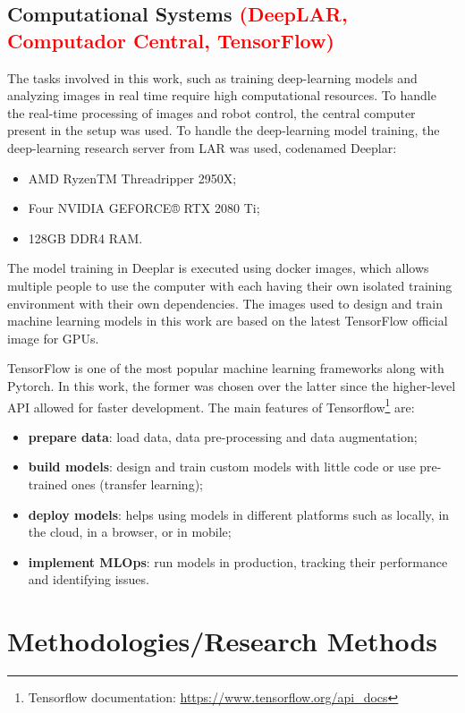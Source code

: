 \subsection{Computational Systems \textcolor{red}{(DeepLAR, Computador Central, TensorFlow)}}

The tasks involved in this work, such as training deep-learning models and analyzing images in real time require high computational resources. To handle the real-time processing of images and robot control, the central computer present in the setup was used. To handle the deep-learning model training, the deep-learning research server from LAR was used, codenamed Deeplar:
\begin{itemize}
    \item AMD RyzenTM Threadripper 2950X;
    \item Four NVIDIA GEFORCE® RTX 2080 Ti;
    \item 128GB DDR4 RAM.
\end{itemize}

The model training in Deeplar is executed using docker images, which allows multiple people to use the computer with each having their own isolated training environment with their own dependencies. The images used to design and train machine learning models in this work are based on the latest TensorFlow official image for GPUs.

TensorFlow is one of the most popular machine learning frameworks along with Pytorch. In this work, the former was chosen over the latter since the higher-level API allowed for faster development. The main features of Tensorflow\footnote{Tensorflow documentation: \url{https://www.tensorflow.org/api_docs}} are:
\begin{itemize}
    \item \textbf{prepare data}: load data, data pre-processing and data augmentation;
    \item \textbf{build models}: design and train custom models with little code or use pre-trained ones (transfer learning);
    \item \textbf{deploy models}: helps using models in different platforms such as locally, in the cloud, in a browser, or in mobile;
    \item \textbf{implement MLOps}: run models in production, tracking their performance and identifying issues.
\end{itemize}

\section{Methodologies/Research Methods}
\label{section:methodologies}

